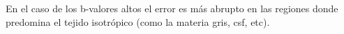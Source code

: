 
En el caso de los b-valores altos el error es m\'as abrupto en las regiones donde predomina el 
tejido isotrópico (como la materia gris, csf, etc).



